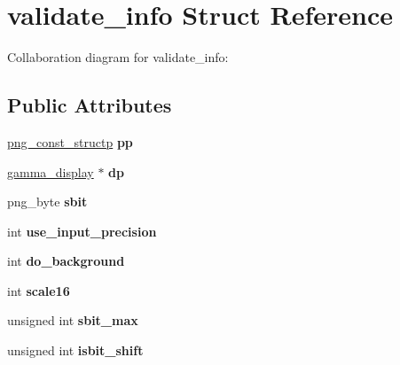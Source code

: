 \hypertarget{structvalidate__info}{\section{validate\+\_\+info Struct Reference}
\label{structvalidate__info}
}


Collaboration diagram for validate\+\_\+info\+:
\subsection*{Public Attributes}
\begin{DoxyCompactItemize}
\item 
\hypertarget{structvalidate__info_a1f127b038e5f9a60f9affc81f598b421}{\hyperlink{structpng__struct__def}{png\+\_\+const\+\_\+structp} {\bfseries pp}}\label{structvalidate__info_a1f127b038e5f9a60f9affc81f598b421}

\item 
\hypertarget{structvalidate__info_a17a89126f5aa96c9c050acdfd03a0c81}{\hyperlink{structgamma__display}{gamma\+\_\+display} $\ast$ {\bfseries dp}}\label{structvalidate__info_a17a89126f5aa96c9c050acdfd03a0c81}

\item 
\hypertarget{structvalidate__info_ae1757400cb6e6dec16e87f092ac7947b}{png\+\_\+byte {\bfseries sbit}}\label{structvalidate__info_ae1757400cb6e6dec16e87f092ac7947b}

\item 
\hypertarget{structvalidate__info_a76ce31a74145d9de08c0ebeffec8e647}{int {\bfseries use\+\_\+input\+\_\+precision}}\label{structvalidate__info_a76ce31a74145d9de08c0ebeffec8e647}

\item 
\hypertarget{structvalidate__info_a47f97a67941f1db8e1a9ba4e26f61130}{int {\bfseries do\+\_\+background}}\label{structvalidate__info_a47f97a67941f1db8e1a9ba4e26f61130}

\item 
\hypertarget{structvalidate__info_acb55b8d071a1932f37bc48436444fd81}{int {\bfseries scale16}}\label{structvalidate__info_acb55b8d071a1932f37bc48436444fd81}

\item 
\hypertarget{structvalidate__info_a21749d0a59cec176e37b8ecbf5149b9a}{unsigned int {\bfseries sbit\+\_\+max}}\label{structvalidate__info_a21749d0a59cec176e37b8ecbf5149b9a}

\item 
\hypertarget{structvalidate__info_aeef96a91df8d11f97502b7ba5126d70e}{unsigned int {\bfseries isbit\+\_\+shift}}\label{structvalidate__info_aeef96a91df8d11f97502b7ba5126d70e}


\end{DoxyCompactItemize}
